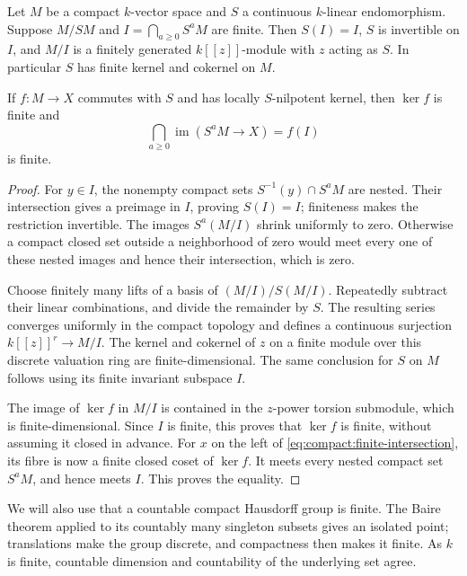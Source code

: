 \begin{lemma}\label{lem:compact:operator}
Let $M$ be a compact $k$-vector space and $S$ a continuous $k$-linear
endomorphism.  Suppose $M/SM$ and $I=\bigcap_{a\geq0}S^aM$ are finite.
Then $S(I)=I$, $S$ is invertible on $I$, and $M/I$ is a finitely
generated $k[[z]]$-module with $z$ acting as $S$.  In particular $S$
has finite kernel and cokernel on $M$.

If $f:M\to X$ commutes with $S$ and has locally $S$-nilpotent kernel,
then $\ker f$ is finite and
\begin{equation}\label{eq:compact:finite-intersection}
 \bigcap_{a\geq0}\operatorname{im}(S^aM\longrightarrow X)=f(I)
\end{equation}
is finite.
\end{lemma}

\begin{proof}
For $y\in I$, the nonempty compact sets
$S^{-1}(y)\cap S^aM$ are nested.  Their intersection gives a preimage
in $I$, proving $S(I)=I$; finiteness makes the restriction invertible.
The images $S^a(M/I)$ shrink uniformly to zero.  Otherwise a compact
closed set outside a neighborhood of zero would meet every one of
these nested images and hence their intersection, which is zero.

Choose finitely many lifts of a basis of $(M/I)/S(M/I)$.  Repeatedly
subtract their linear combinations, and divide the remainder by $S$.
The resulting series converges uniformly in the compact topology and
defines a continuous surjection $k[[z]]^r\to M/I$.  The kernel and
cokernel of $z$ on a finite module over this discrete valuation ring
are finite-dimensional.  The same conclusion for $S$ on $M$ follows
using its finite invariant subspace $I$.

The image of $\ker f$ in $M/I$ is contained in the $z$-power torsion
submodule, which is finite-dimensional.  Since $I$ is finite, this
proves that $\ker f$ is finite, without assuming it closed in advance.
For $x$ on the left of \eqref{eq:compact:finite-intersection}, its fibre
is now a finite closed coset of $\ker f$.  It meets every nested compact
set $S^aM$, and hence meets $I$.  This proves the equality.
\end{proof}

We will also use that a countable compact Hausdorff group is finite.
The Baire theorem applied to its countably many singleton subsets gives
an isolated point; translations make the group discrete, and
compactness then makes it finite.  As $k$ is finite, countable
dimension and countability of the underlying set agree.

